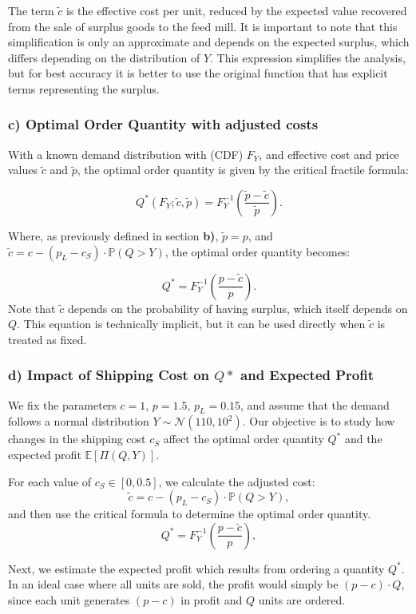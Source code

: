 \noindent
The term $\tilde{c}$ is the effective cost per unit, reduced by the expected value recovered from the sale of surplus goods to the feed mill. It is important to note that this simplification is only an approximate and depends on the expected surplus, which differs depending on the distribution of $Y$. This expression simplifies the analysis, but for best accuracy it is better to use the original function that has explicit terms representing the surplus.


\subsubsection*{c) Optimal Order Quantity with adjusted costs}
\noindent 
With a known demand distribution with (CDF) $F_Y$, and effective cost and price values $\tilde{c}$ and $\tilde{p}$, the optimal order quantity is given by the critical fractile formula:

\[
Q^*(F_Y; \tilde{c}, \tilde{p}) = F_Y^{-1} \left( \frac{\tilde{p} - \tilde{c}}{\tilde{p}} \right).
\]

\noindent
Where, as previously defined in section \textbf{b)}, $\tilde{p} = p$, and $\tilde{c} = c - (p_L - c_S) \cdot \mathbb{P}(Q > Y)$, the optimal order quantity becomes:

\[
Q^* = F_Y^{-1} \left( \frac{p - \tilde{c}}{p} \right).
\]
\noindent
Note that $\tilde{c}$ depends on the probability of having surplus, which itself depends on $Q$. This equation is technically implicit, but it can be used directly when $\tilde{c}$ is treated as fixed.


\subsubsection*{\boldmath d) Impact of Shipping Cost on $Q*$ and Expected Profit}

We fix the parameters $c = 1$, $p = 1.5$, $p_L = 0.15$, and assume that the demand follows a normal distribution $Y \sim \mathcal{N}(110, 10^2)$. Our objective is to study how changes in the shipping cost $c_S$ affect the optimal order quantity $Q^*$ and the expected profit $\mathbb{E}[\Pi(Q, Y)]$. \bigskip

\noindent
For each value of $c_S \in [0, 0.5]$, we calculate the adjusted cost:
\[
\tilde{c} = c - (p_L - c_S) \cdot \mathbb{P}(Q > Y),
\]
and then use the critical formula to determine the optimal order quantity.
\[
Q^* = F_Y^{-1} \left( \frac{p - \tilde{c}}{p} \right),
\]

Next, we estimate the expected profit which results from ordering a quantity $Q^*$. In an ideal case where all units are sold, the profit would simply be $(p - c) \cdot Q$,
since each unit generates $(p - c)$ in profit and $Q$ units are ordered.

